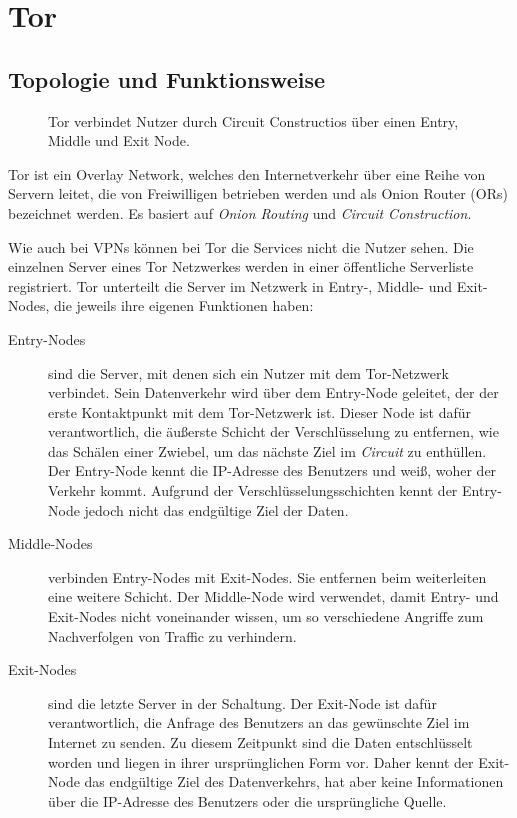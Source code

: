 \section{Tor}
\label{chap:tor}

\subsection{Topologie und Funktionsweise}
\label{chap:tor_topology}
 
\begin{figure}[h!]
    \centering
    
    \caption{Tor verbindet Nutzer durch Circuit Constructios über einen Entry, Middle und Exit Node.}
    \label{imgs:tor}
\end{figure}

Tor ist ein Overlay Network, welches den Internetverkehr über eine Reihe von Servern leitet, die von Freiwilligen betrieben werden und als Onion Router (ORs) bezeichnet werden. Es basiert auf \textit{Onion Routing} und \textit{Circuit Construction}\cite{TorWhitePaper}.

Wie auch bei VPNs können bei Tor die Services nicht die Nutzer sehen. Die einzelnen Server eines Tor Netzwerkes werden in einer öffentliche Serverliste registriert\cite{CorrelationAttackTor}. Tor unterteilt die Server im Netzwerk in Entry-, Middle- und Exit-Nodes, die jeweils ihre eigenen Funktionen haben:

\begin{description}
    \item[Entry-Nodes] sind die Server, mit denen sich ein Nutzer mit dem Tor-Netzwerk verbindet. Sein Datenverkehr wird über dem Entry-Node geleitet, der der erste Kontaktpunkt mit dem Tor-Netzwerk ist. Dieser Node ist dafür verantwortlich, die äußerste Schicht der Verschlüsselung zu entfernen, wie das Schälen einer Zwiebel, um das nächste Ziel im \textit{Circuit} zu enthüllen. Der Entry-Node kennt die IP-Adresse des Benutzers und weiß, woher der Verkehr kommt. Aufgrund der Verschlüsselungsschichten kennt der Entry-Node jedoch nicht das endgültige Ziel der Daten.
    \item[Middle-Nodes] verbinden Entry-Nodes mit Exit-Nodes. Sie entfernen beim weiterleiten eine weitere Schicht. Der Middle-Node wird verwendet, damit Entry- und Exit-Nodes nicht voneinander wissen, um so verschiedene Angriffe zum Nachverfolgen von Traffic zu verhindern.
    \item[Exit-Nodes] sind  die letzte Server in der Schaltung. Der Exit-Node ist dafür verantwortlich, die Anfrage des Benutzers an das gewünschte Ziel im Internet zu senden. Zu diesem Zeitpunkt sind die Daten entschlüsselt worden und liegen in ihrer ursprünglichen Form vor. Daher kennt der Exit-Node das endgültige Ziel des Datenverkehrs, hat aber keine Informationen über die IP-Adresse des Benutzers oder die ursprüngliche Quelle.
\end{description}

